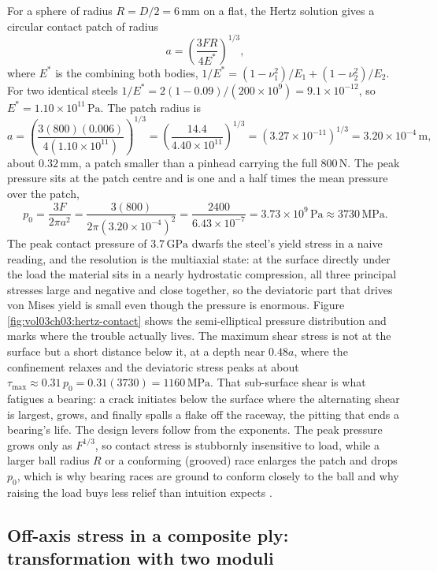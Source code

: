 For a sphere of radius $R = D/2 = 6\,\si{\milli\meter}$ on a flat, the
Hertz solution gives a circular contact patch of radius
\[
a = \left(\frac{3 F R}{4 E^*}\right)^{1/3},
\]
where $E^*$ is the  combining both bodies,
$1/E^* = (1-\nu_1^2)/E_1 + (1-\nu_2^2)/E_2$. For two identical steels
$1/E^* = 2(1 - 0.09)/(200\times 10^9) = 9.1\times 10^{-12}$, so $E^* =
1.10\times 10^{11}\,\text{Pa}$. The patch radius is
\[
a = \left(\frac{3(800)(0.006)}{4(1.10\times 10^{11})}\right)^{1/3} =
\left(\frac{14.4}{4.40\times 10^{11}}\right)^{1/3} = (3.27\times
10^{-11})^{1/3} = 3.20\times 10^{-4}\,\si{\meter},
\]
about $0.32\,\si{\milli\meter}$, a patch smaller than a pinhead carrying
the full $800\,\text{N}$. The peak pressure sits at the patch centre and
is one and a half times the mean pressure over the patch,
\[
p_0 = \frac{3F}{2\pi a^2} = \frac{3(800)}{2\pi(3.20\times 10^{-4})^2} =
\frac{2400}{6.43\times 10^{-7}} = 3.73\times 10^9\,\text{Pa} \approx
3730\,\text{MPa}.
\]
The peak contact pressure of $3.7\,\text{GPa}$ dwarfs the steel's yield
stress in a naive reading, and the resolution is the multiaxial state: at
the surface directly under the load the material sits in a nearly
hydrostatic compression, all three principal stresses large and negative
and close together, so the deviatoric part that drives von Mises yield is
small even though the pressure is enormous. Figure
\ref{fig:vol03ch03:hertz-contact} shows the semi-elliptical pressure
distribution and marks where the trouble actually lives. The maximum
shear stress is not at the surface but a short distance below it, at a
depth near $0.48a$, where the confinement relaxes and the deviatoric
stress peaks at about $\tau_{\max} \approx 0.31\,p_0 = 0.31(3730) =
1160\,\text{MPa}$. That sub-surface shear is what fatigues a bearing: a
crack initiates below the surface where the alternating shear is largest,
grows, and finally spalls a flake off the raceway, the pitting that ends a
bearing's life. The design levers follow from the exponents. The peak
pressure grows only as $F^{1/3}$, so contact stress is stubbornly
insensitive to load, while a larger ball radius $R$ or a conforming
(grooved) race enlarges the patch and drops $p_0$, which is why bearing
races are ground to conform closely to the ball and why raising the load
buys less relief than intuition expects \cite[ch.~3]{text:shigley2020}.



\subsection{Off-axis stress in a composite ply: transformation with two moduli}

